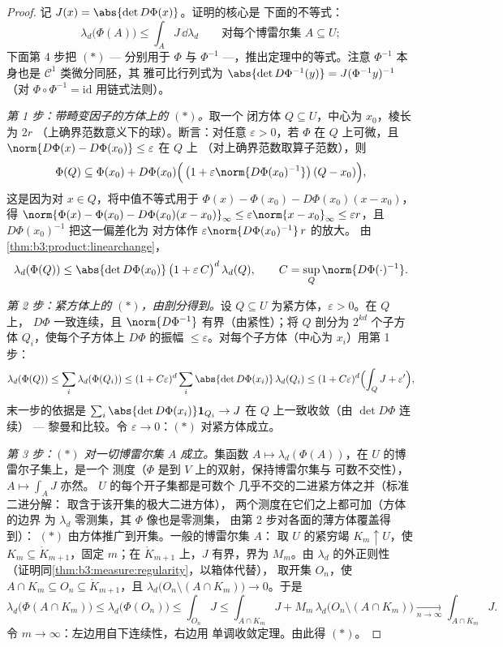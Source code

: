 \begin{proof}
记 $J(x) = \abs{\det D\Phi(x)}$。证明的核心是
下面的不等式：
\[
\lambda_d\bigl(\Phi(A)\bigr) \leq \int_A J\,\dd\lambda_d
\qquad\text{对每个博雷尔集 } A \subseteq U;
\tag{$*$}
\]
下面第 4 步把 $(*)$ --- 分别用于 $\Phi$ 与
$\Phi^{-1}$ ---，推出定理中的等式。注意
$\Phi^{-1}$ 本身也是 $\mathcal C^1$ 类微分同胚，其
雅可比行列式为 $\abs{\det D\Phi^{-1}(y)} = J(\Phi^{-1}y)^{-1}$
（对 $\Phi\circ\Phi^{-1} = \mathrm{id}$ 用链式法则）。

\emph{第 1 步：带畸变因子的方体上的 $(*)$。}取一个
闭方体 $Q \subseteq U$，中心为 $x_0$，棱长为 $2r$
（上确界范数意义下的球）。断言：对任意 $\varepsilon > 0$，若 $\Phi$
在 $Q$ 上可微，且
$\norm{D\Phi(x) - D\Phi(x_0)} \leq \varepsilon$ 在 $Q$ 上
（对上确界范数取算子范数），则
\[
\Phi(Q) \subseteq \Phi(x_0) + D\Phi(x_0)\Bigl(\,\bigl(1 +
\varepsilon\norm{D\Phi(x_0)^{-1}}\bigr)\,(Q - x_0)\Bigr),
\]
这是因为对 $x \in Q$，将中值不等式用于
$\Phi(x) - \Phi(x_0) - D\Phi(x_0)(x - x_0)$，得
$\norm{\Phi(x) - \Phi(x_0) - D\Phi(x_0)(x-x_0)}_\infty \leq
\varepsilon\norm{x - x_0}_\infty \leq \varepsilon r$，且
$D\Phi(x_0)^{-1}$ 把这一偏差化为
对方体作 $\varepsilon\norm{D\Phi(x_0)^{-1}}\,r$ 的放大。
由\cref{thm:b3:product:linearchange}，
\[
\lambda_d(\Phi(Q)) \leq \abs{\det D\Phi(x_0)}\,
\bigl(1 + \varepsilon\,C\bigr)^{d}\,\lambda_d(Q),
\qquad C = \sup_{Q}\norm{D\Phi(\cdot)^{-1}} .
\]

\emph{第 2 步：紧方体上的 $(*)$，由剖分得到。}设 $Q
\subseteq U$ 为紧方体，$\varepsilon > 0$。在 $Q$ 上，
$D\Phi$ 一致连续，且 $\norm{D\Phi^{-1}}$
有界（由紧性）；将 $Q$ 剖分为 $2^{kd}$ 个子方体
$Q_i$，使每个子方体上 $D\Phi$ 的振幅
$\leq \varepsilon$。对每个子方体（中心为 $x_i$）用第 1 步：
\[
\lambda_d(\Phi(Q)) \leq \sum_i\lambda_d(\Phi(Q_i))
\leq (1 + C\varepsilon)^d \sum_i \abs{\det
D\Phi(x_i)}\,\lambda_d(Q_i)
\leq (1 + C\varepsilon)^d\Bigl(\int_Q J + \varepsilon'\Bigr),
\]
末一步的依据是 $\sum_i\abs{\det D\Phi(x_i)}\mathbf
1_{Q_i} \to J$ 在 $Q$ 上一致收敛（由 $\det D\Phi$ 连续）
--- 黎曼和比较。令 $\varepsilon \to 0$：$(*)$
对紧方体成立。

\emph{第 3 步：$(*)$ 对一切博雷尔集 $A$ 成立。}集函数 $A
\mapsto \lambda_d(\Phi(A))$，在 $U$ 的博雷尔子集上，是一个
测度（$\Phi$ 是到 $V$ 上的双射，保持博雷尔集与
可数不交性），$A \mapsto \int_AJ$ 亦然。
$U$ 的每个开子集都是可数个
几乎不交的二进紧方体之并（标准二进分解：
取含于该开集的极大二进方体），
两个测度在它们之上都可加（方体的边界
为 $\lambda_d$ 零测集，其 $\Phi$ 像也是零测集，
由第 2 步对各面的薄方体覆盖得到）：
$(*)$ 由方体推广到开集。一般的博雷尔集 $A$：
取 $U$ 的紧穷竭 $K_m \uparrow U$，使 $K_m \subseteq
\mathring K_{m+1}$，固定 $m$；在 $\mathring K_{m+1}$ 上，$J$
有界，界为 $M_m$。由 $\lambda_d$ 的外正则性
（证明同\cref{thm:b3:measure:regularity}，以箱体代替），
取开集 $O_n$，使 $A \cap K_m \subseteq O_n
\subseteq \mathring K_{m+1}$，且 $\lambda_d\bigl(O_n \setminus
(A\cap K_m)\bigr) \to 0$。于是
\[
\lambda_d\bigl(\Phi(A\cap K_m)\bigr) \leq
\lambda_d\bigl(\Phi(O_n)\bigr) \leq \int_{O_n}J
\leq \int_{A\cap K_m}J + M_m\,\lambda_d\bigl(O_n\setminus(A\cap
K_m)\bigr) \xrightarrow[n\to\infty]{} \int_{A\cap K_m}J .
\]
令 $m \to \infty$：左边用自下连续性，右边用
单调收敛定理。由此得 $(*)$。


\end{proof}
